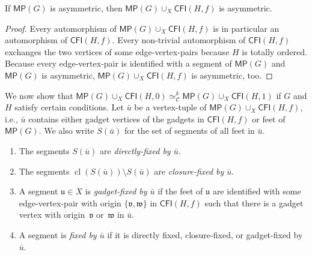 \documentclass[]{lmcs}
\newcommand{\defining}[1]{\emph{#1}}
\newcommand{\set}[1]{\lbrace #1 \rbrace}
\newcommand{\tup}[1]{\bar{#1}}
\newcommand{\vertA}{u}
\newcommand{\CFIsym}{\mathsf{CFI}}
\newcommand{\CFI}[1]{\CFIsym(#1)}
\newcommand{\bVertA}{\mathfrak{u}}
\newcommand{\bVertB}{\mathfrak{v}}
\newcommand{\bVertC}{\mathfrak{w}}
\newcommand{\multipede}[1]{\mathsf{MP}(#1)}
\newcommand{\footbset}{X}
\newcommand{\footbsetA}{X}
\newcommand{\closure}[1]{\operatorname{cl}(#1)}
\newcommand{\gluing}[3]{#1 \cup_#2 #3}
\newcommand{\kequiv}[1]{\simeq^#1_{\mathcal{C}}}
\newcommand{\segmentOf}[1]{S(#1)}
\begin{document}
\begin{lem}
	\label{lem:glueing-asymmetric}
	If $\multipede{G}$ is asymmetric, then $\gluing{\multipede{G}}{\footbset}{\CFI{H, f}}$
	is asymmetric.
\end{lem}
\begin{proof}
	Every automorphism of 
	$\gluing{\multipede{G}}{\footbset}{\CFI{H, f}}$
	 is in particular an automorphism of 
	$\CFI{H, f}$.
	Every non-trivial automorphism of $\CFI{H, f}$
	exchanges the two vertices of some edge-vertex-pairs because $H$ is totally ordered.
	Because every edge-vertex-pair is identified with a segment of $\multipede{G}$
	and $\multipede{G}$ is asymmetric,
	$\gluing{\multipede{G}}{\footbset}{\CFI{H, f}}$ is asymmetric, too.
\end{proof}

We now show that
$\gluing{\multipede{G}}{\footbset}{\CFI{H, 0}} \kequiv{k} \gluing{\multipede{G}}{\footbset}{\CFI{H, 1}}$
if $G$ and $H$ satisfy certain conditions.
Let $\tup{\vertA}$ be a vertex-tuple of $\gluing{\multipede{G}}{\footbset}{\CFI{H, f}}$,
i.e., $\tup{\vertA}$ contains either gadget vertices of the gadgets in $\CFI{H,f}$
or feet of $\multipede{G}$. We also write $\segmentOf{\tup{\vertA}}$
for the set of segments of all feet in $\tup{\vertA}$.
\begin{enumerate}
	\item The segments $\segmentOf{\tup{\vertA}}$ are \defining{directly-fixed by $\tup{\vertA}$}.
	\item The segments $\closure{\segmentOf{\tup{\vertA}}} \setminus \segmentOf{\tup{\vertA}}$ are \defining{closure-fixed by $\tup{\vertA}$}.
	\item A segment $\bVertA \in \footbsetA$ is \defining {gadget-fixed by $\tup{\vertA}$}
	if the feet of $\bVertA$ are identified with some edge-vertex-pair with origin $\set{\bVertB,\bVertC}$ in $\CFI{H,f}$
	such that there is a gadget vertex with origin~$\bVertB$ or~$\bVertC$ in $\tup{\vertA}$.
	\item A segment is \defining{fixed by $\tup{\vertA}$} if it is directly fixed, closure-fixed, or gadget-fixed by $\tup{\vertA}$.
\end{enumerate}
\end{document}
